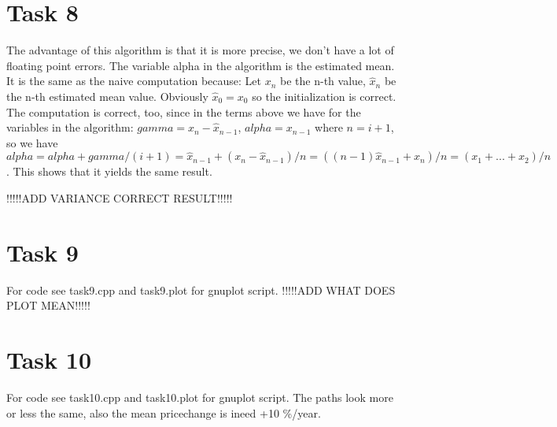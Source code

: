 \documentclass[]{article}
\begin{document}
\section*{Task 8} The advantage of this algorithm is that it is more precise, we
don't have a lot of floating point errors. The variable alpha in the algorithm
is the estimated mean. It is the same as the naive computation because: Let
$x_n$ be the n-th value, $\hat{x}_n$ be the n-th estimated mean value. Obviously
$\hat{x}_0=x_0$ so the initialization is correct. The computation is correct,
too, since in the terms above we have for the variables in the algorithm:
$gamma=x_n-\hat{x}_{n-1}$, $alpha=x_{n-1}$ where $n=i+1$, so we have
$alpha=alpha+gamma/(i+1)=\hat{x}_{n-1}+(x_n-\hat{x}_{n-1})/n=((n-1)\hat{x}_{n-1}+x_n)/n=(x_1+...+x_2)/n$.
This shows that it yields the same result.

!!!!!ADD VARIANCE CORRECT RESULT!!!!!

\section*{Task 9}
For code see task9.cpp and task9.plot for gnuplot script.
!!!!!ADD WHAT DOES PLOT MEAN!!!!!

\section*{Task 10} For code see task10.cpp and task10.plot for gnuplot script.
The paths look more or less the same, also the mean pricechange is ineed +10
\%/year.
\end{document}
